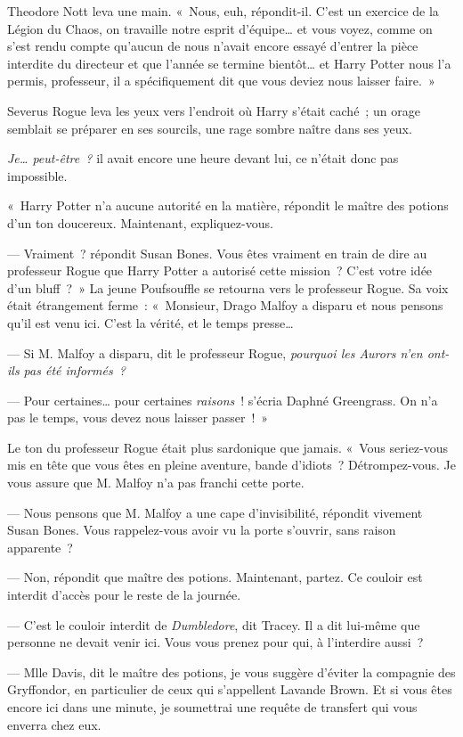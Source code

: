 Theodore Nott leva une main. «~Nous, euh, répondit-il. C'est un exercice de la Légion du Chaos, on travaille notre esprit d'équipe… et vous voyez, comme on s'est rendu compte qu'aucun de nous n'avait encore essayé d'entrer la pièce interdite du directeur et que l'année se termine bientôt… et Harry Potter nous l'a permis, professeur, il a spécifiquement dit que vous deviez nous laisser faire.~»

Severus Rogue leva les yeux vers l'endroit où Harry s'était caché~; un orage semblait se préparer en ses sourcils, une rage sombre naître dans ses yeux.

\emph{Je… peut-être~?} il avait encore une heure devant lui, ce n'était donc pas impossible.

«~Harry Potter n'a aucune autorité en la matière, répondit le maître des potions d'un ton doucereux. Maintenant, expliquez-vous.

--- Vraiment~? répondit Susan Bones. Vous êtes vraiment en train de dire au professeur Rogue que Harry Potter a autorisé cette mission~? C'est votre idée d'un bluff~?~» La jeune Poufsouffle se retourna vers le professeur Rogue. Sa voix était étrangement ferme~: «~Monsieur, Drago Malfoy a disparu et nous pensons qu'il est venu ici. C'est la vérité, et le temps presse…

--- Si M. Malfoy a disparu, dit le professeur Rogue, \emph{pourquoi les Aurors n'en ont-ils pas été informés~?}

--- Pour certaines… pour certaines \emph{raisons}~! s'écria Daphné Greengrass. On n'a pas le temps, vous devez nous laisser passer~!~»

Le ton du professeur Rogue était plus sardonique que jamais. «~Vous seriez-vous mis en tête que vous êtes en pleine aventure, bande d'idiots~? Détrompez-vous. Je vous assure que M. Malfoy n'a pas franchi cette porte.

--- Nous pensons que M. Malfoy a une cape d'invisibilité, répondit vivement Susan Bones. Vous rappelez-vous avoir vu la porte s'ouvrir, sans raison apparente~?

--- Non, répondit que maître des potions. Maintenant, partez. Ce couloir est interdit d'accès pour le reste de la journée.

--- C'est le couloir interdit de \emph{Dumbledore}, dit Tracey. Il a dit lui-même que personne ne devait venir ici. Vous vous prenez pour qui, à l'interdire aussi~?

--- Mlle Davis, dit le maître des potions, je vous suggère d'éviter la compagnie des Gryffondor, en particulier de ceux qui s'appellent Lavande Brown. Et si vous êtes encore ici dans une minute, je soumettrai une requête de transfert qui vous enverra chez eux.

